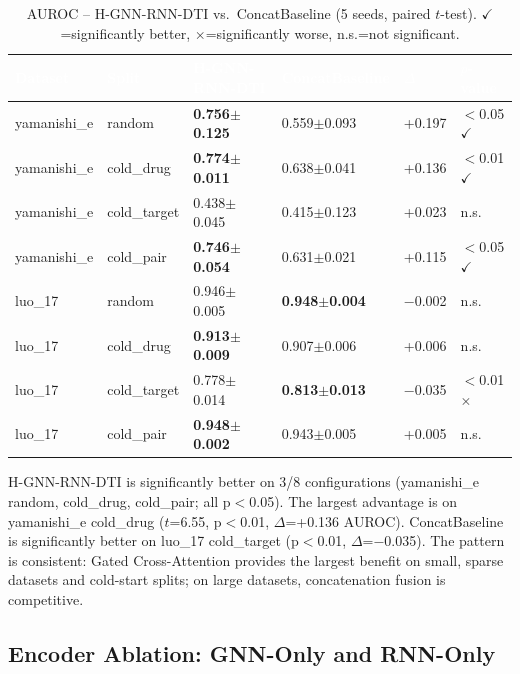 \documentclass[12pt,a4paper,oneside]{report}
\newcommand{\sig}[1]{\textbf{#1}}
\newcommand{\sigbetter}{{\color{green}$\checkmark$}}
\newcommand{\sigworse}{{\color{red}$\times$}}
\begin{document}
\begin{table}[htbp]
\centering
\caption{AUROC -- H-GNN-RNN-DTI vs.\ ConcatBaseline (5 seeds, paired $t$-test). $\checkmark$=significantly better, $\times$=significantly worse, n.s.=not significant.}
\label{tab:obj1-auroc}
\begin{tabular}{@{}L{1.8cm}L{1.8cm}C{2.0cm}C{2.0cm}C{1.0cm}C{1.4cm}@{}}
\toprule
{}
\textcolor{white}{\textbf{Dataset}} &
\textcolor{white}{\textbf{Split}} &
\textcolor{white}{\textbf{H-GNN-RNN-DTI}} &
\textcolor{white}{\textbf{ConcatBaseline}} &
\textcolor{white}{\textbf{$\Delta$}} &
\textcolor{white}{\textbf{$p$-value}} \\
\midrule
{}
yamanishi\_e & random      & \sig{0.756$\pm$0.125} & 0.559$\pm$0.093 & +0.197 & ${<}$0.05 \sigbetter \\
yamanishi\_e & cold\_drug  & \sig{0.774$\pm$0.011} & 0.638$\pm$0.041 & +0.136 & ${<}$0.01 \sigbetter \\
yamanishi\_e & cold\_target& 0.438$\pm$0.045 & 0.415$\pm$0.123 & +0.023 & n.s. \\
yamanishi\_e & cold\_pair  & \sig{0.746$\pm$0.054} & 0.631$\pm$0.021 & +0.115 & ${<}$0.05 \sigbetter \\
luo\_17 & random           & 0.946$\pm$0.005 & \sig{0.948$\pm$0.004} & $-$0.002 & n.s. \\
luo\_17 & cold\_drug       & \sig{0.913$\pm$0.009} & 0.907$\pm$0.006 & +0.006 & n.s. \\
luo\_17 & cold\_target     & 0.778$\pm$0.014 & \sig{0.813$\pm$0.013} & $-$0.035 & ${<}$0.01 \sigworse \\
luo\_17 & cold\_pair       & \sig{0.948$\pm$0.002} & 0.943$\pm$0.005 & +0.005 & n.s. \\
\bottomrule
\end{tabular}
\end{table}

H-GNN-RNN-DTI is significantly better on 3/8 configurations (yamanishi\_e random, cold\_drug, cold\_pair; all p${<}$0.05). The largest advantage is on yamanishi\_e cold\_drug ($t$=6.55, p${<}$0.01, $\Delta$=+0.136 AUROC). ConcatBaseline is significantly better on luo\_17 cold\_target (p${<}$0.01, $\Delta$=$-$0.035). The pattern is consistent: Gated Cross-Attention provides the largest benefit on small, sparse datasets and cold-start splits; on large datasets, concatenation fusion is competitive.

\subsection{Encoder Ablation: GNN-Only and RNN-Only}
\end{document}
